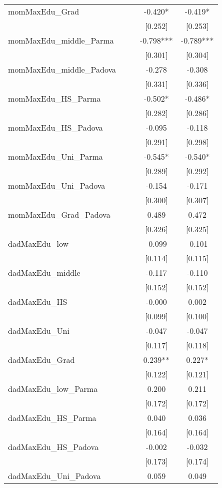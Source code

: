 \documentclass[]{article}
\begin{document}
\begin{tabular}{lcccc}
momMaxEdu\_Grad &  &  & -0.420* & -0.419* \\
 &  &  & [0.252] & [0.253] \\
momMaxEdu\_middle\_Parma &  &  & -0.798*** & -0.789*** \\
 &  &  & [0.301] & [0.304] \\
momMaxEdu\_middle\_Padova &  &  & -0.278 & -0.308 \\
 &  &  & [0.331] & [0.336] \\
momMaxEdu\_HS\_Parma &  &  & -0.502* & -0.486* \\
 &  &  & [0.282] & [0.286] \\
momMaxEdu\_HS\_Padova &  &  & -0.095 & -0.118 \\
 &  &  & [0.291] & [0.298] \\
momMaxEdu\_Uni\_Parma &  &  & -0.545* & -0.540* \\
 &  &  & [0.289] & [0.292] \\
momMaxEdu\_Uni\_Padova &  &  & -0.154 & -0.171 \\
 &  &  & [0.300] & [0.307] \\
momMaxEdu\_Grad\_Padova &  &  & 0.489 & 0.472 \\
 &  &  & [0.326] & [0.325] \\
dadMaxEdu\_low &  &  & -0.099 & -0.101 \\
 &  &  & [0.114] & [0.115] \\
dadMaxEdu\_middle &  &  & -0.117 & -0.110 \\
 &  &  & [0.152] & [0.152] \\
dadMaxEdu\_HS &  &  & -0.000 & 0.002 \\
 &  &  & [0.099] & [0.100] \\
dadMaxEdu\_Uni &  &  & -0.047 & -0.047 \\
 &  &  & [0.117] & [0.118] \\
dadMaxEdu\_Grad &  &  & 0.239** & 0.227* \\
 &  &  & [0.122] & [0.121] \\
dadMaxEdu\_low\_Parma &  &  & 0.200 & 0.211 \\
 &  &  & [0.172] & [0.172] \\
dadMaxEdu\_HS\_Parma &  &  & 0.040 & 0.036 \\
 &  &  & [0.164] & [0.164] \\
dadMaxEdu\_HS\_Padova &  &  & -0.002 & -0.032 \\
 &  &  & [0.173] & [0.174] \\
dadMaxEdu\_Uni\_Padova &  &  & 0.059 & 0.049 \\

\end{tabular}
\end{document}
